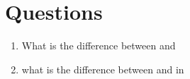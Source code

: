 \section{Questions}

\begin{enumerate}
\item What is the difference between 
 and 

\item what is the difference between  
and  in 

\end{enumerate}